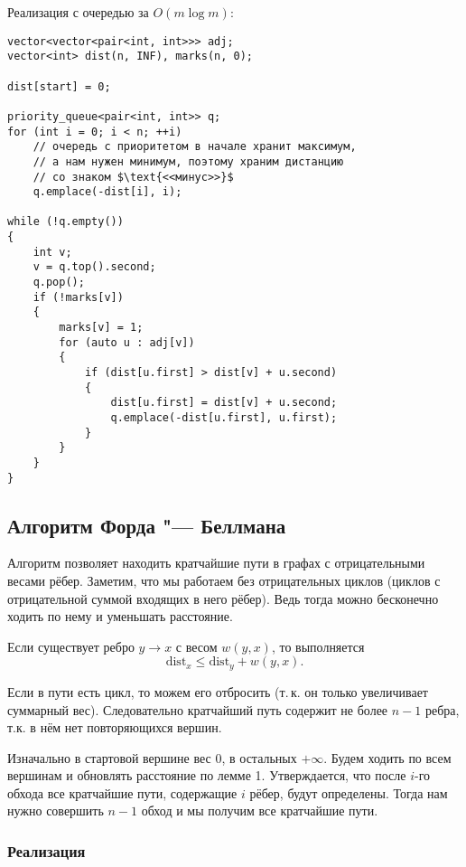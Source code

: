 \noindent
Реализация с очередью за $O(m\log m)$:

\begin{verbatim}
vector<vector<pair<int, int>>> adj;
vector<int> dist(n, INF), marks(n, 0);

dist[start] = 0;

priority_queue<pair<int, int>> q;
for (int i = 0; i < n; ++i)
    // очередь с приоритетом в начале хранит максимум,
    // а нам нужен минимум, поэтому храним дистанцию
    // со знаком $\text{<<минус>>}$
    q.emplace(-dist[i], i);

while (!q.empty())
{
    int v;
    v = q.top().second;
    q.pop();
    if (!marks[v])
    {
        marks[v] = 1;
        for (auto u : adj[v])
        {
            if (dist[u.first] > dist[v] + u.second)
            {
                dist[u.first] = dist[v] + u.second;
                q.emplace(-dist[u.first], u.first);
            }
        }
    }
}
\end{verbatim}

\subsection{Алгоритм Форда "--- Беллмана}

Алгоритм позволяет находить кратчайшие пути в графах с отрицательными весами рёбер. Заметим, что мы работаем без отрицательных циклов (циклов с отрицательной суммой входящих в него рёбер). Ведь тогда можно бесконечно ходить по нему и уменьшать расстояние.

\begin{lemma} Если существует ребро $y \rightarrow x$ с весом $w(y, x)$, то выполняется \[\mathrm{dist}_x \leqslant \mathrm{dist}_y + w(y, x).\]
\end{lemma}

\begin{lemma}
    Если в пути есть цикл, то можем его отбросить (т.\,к. он только увеличивает суммарный вес). Следовательно кратчайший путь содержит не более $n - 1$ ребра, т.к. в нём нет повторяющихся вершин.
\end{lemma}

Изначально в стартовой вершине вес $0$, в остальных $+\infty$. Будем ходить по всем вершинам и обновлять расстояние по лемме 1. Утверждается, что после $i$-го обхода все кратчайшие пути, содержащие $i$ рёбер, будут определены. Тогда нам нужно совершить $n - 1$ обход и мы получим все кратчайшие пути.

\subsubsection{Реализация}

